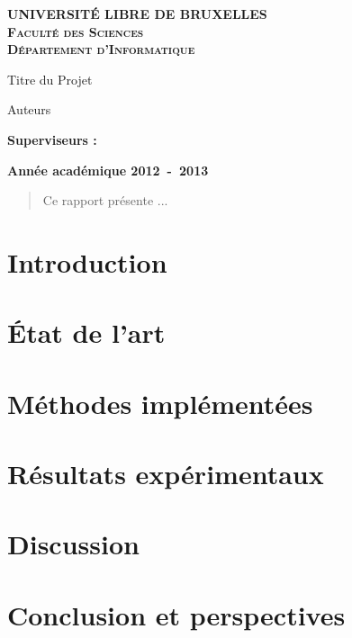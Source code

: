 \documentclass[a4paper,10pt]{report}
\begin{document}
\begin{titlepage}
\begin{center}
\textbf{\textsc{UNIVERSIT\'E LIBRE DE BRUXELLES}}\\
\textbf{\textsc{Faculté des Sciences}}\\
\textbf{\textsc{Département d'Informatique}}
\vfill{}\vfill{}
\begin{center}{\Huge Titre du Projet}\end{center}{\Huge \par}
\begin{center}{\large Auteurs}\end{center}{\Huge \par}
\vfill{}\vfill{}
\begin{flushleft}{\large \textbf{Superviseurs :}}\hfill{}\end{flushleft}{\large\par}
\vfill{}\vfill{}\enlargethispage{3cm}
\textbf{Année académique 2012~-~2013}
\end{center}
\end{titlepage}

\begin{abstract}
Ce rapport présente ...
\end{abstract}


\tableofcontents

\chapter{Introduction}


\chapter{État de l'art}


\chapter{Méthodes implémentées}


\chapter{Résultats expérimentaux}


\chapter{Discussion}


\chapter{Conclusion et perspectives}




%
\end{document}
